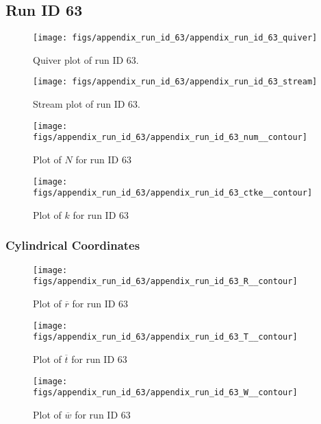 \subsection{Run ID 63}
\begin{figure}[H]
\centering
\texttt{[image: figs/appendix\_run\_id\_63/appendix\_run\_id\_63\_quiver]}
\caption{Quiver plot of run ID 63.}
\label{fig:appendix_run_id_63_quiver}
\end{figure}


\begin{figure}[H]
\centering
\texttt{[image: figs/appendix\_run\_id\_63/appendix\_run\_id\_63\_stream]}
\caption{Stream plot of run ID 63.}
\label{fig:appendix_run_id_63_stream}
\end{figure}


\begin{figure}[H]
\centering
\texttt{[image: figs/appendix\_run\_id\_63/appendix\_run\_id\_63\_num\_\_contour]}
\caption{Plot of $N$ for run ID 63}
\label{fig:appendix_run_id_63_num__contour}
\end{figure}


\begin{figure}[H]
\centering
\texttt{[image: figs/appendix\_run\_id\_63/appendix\_run\_id\_63\_ctke\_\_contour]}
\caption{Plot of $k$ for run ID 63}
\label{fig:appendix_run_id_63_ctke__contour}
\end{figure}


\subsubsection{Cylindrical Coordinates}
\begin{figure}[H]
\centering
\texttt{[image: figs/appendix\_run\_id\_63/appendix\_run\_id\_63\_R\_\_contour]}
\caption{Plot of $\overline{r}$ for run ID 63}
\label{fig:appendix_run_id_63_R__contour}
\end{figure}


\begin{figure}[H]
\centering
\texttt{[image: figs/appendix\_run\_id\_63/appendix\_run\_id\_63\_T\_\_contour]}
\caption{Plot of $\overline{t}$ for run ID 63}
\label{fig:appendix_run_id_63_T__contour}
\end{figure}


\begin{figure}[H]
\centering
\texttt{[image: figs/appendix\_run\_id\_63/appendix\_run\_id\_63\_W\_\_contour]}
\caption{Plot of $\overline{w}$ for run ID 63}
\label{fig:appendix_run_id_63_W__contour}
\end{figure}


